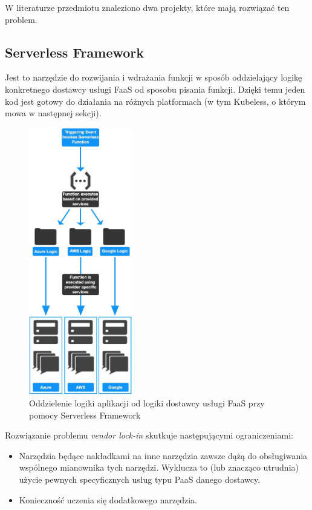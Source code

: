 \documentclass[12pt,a4paper,twoside,titlepage,openright]{book}
\begin{document}
W literaturze przedmiotu znaleziono dwa projekty, które mają rozwiązać ten problem.

\subsection{Serverless Framework}

Jest to narzędzie do rozwijania i wdrażania funkcji w sposób oddzielający logikę konkretnego dostawcy usługi FaaS od sposobu pisania funkcji. Dzięki temu jeden kod jest gotowy do działania na różnych platformach (w tym Kubeless, o którym mowa w następnej sekcji). \cite{serverlessMaddie}

\begin{figure}[h]
	\centering
			\includegraphics[width=0.4\textwidth]{serverless-framework.png}
		\caption{Oddzielenie logiki aplikacji od logiki dostawcy usługi FaaS przy pomocy Serverless Framework \cite{serverlessMaddie}}
		\label{fig:serverless-framework}
\end{figure}

Rozwiązanie problemu \textit{vendor lock-in} skutkuje następującymi ograniczeniami:
\begin{itemize}
\item Narzędzia będące nakładkami na inne narzędzia zawsze dążą do obsługiwania wspólnego mianownika tych narzędzi. Wyklucza to (lub znacząco utrudnia) użycie pewnych specyficznych usług typu PaaS danego dostawcy.
\item Konieczność uczenia się dodatkowego narzędzia.
\end{itemize}
\end{document}
